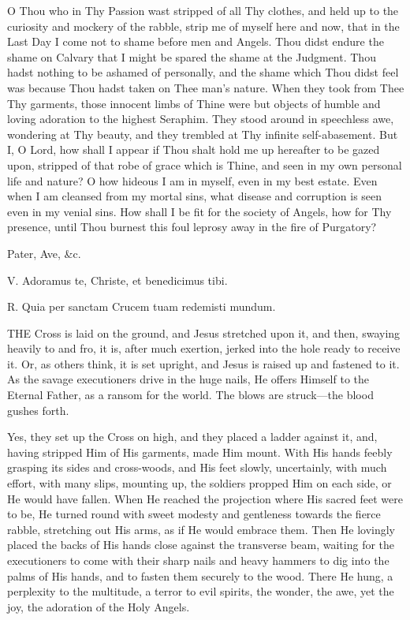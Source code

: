 O Thou who in Thy Passion wast
stripped of all Thy clothes, and held up to the curiosity and mockery of
the rabble, strip me of myself here and now, that in the Last Day I come
not to shame before men and Angels. Thou didst endure the shame on
Calvary that I might be spared the shame at the Judgment. Thou hadst
nothing to be ashamed of personally, and the shame which Thou didst feel
was because Thou hadst taken on Thee man's nature. When they took from
Thee Thy garments, those innocent limbs of Thine were but objects of
humble and loving adoration to the highest Seraphim. They stood around
in speechless awe, wondering at Thy beauty, and they trembled at Thy
infinite self-abasement. But I, O Lord, how shall I appear if Thou shalt
hold me up hereafter to be gazed upon, stripped of that robe of grace
which is Thine, and seen in my own personal life and nature? O how
hideous I am in myself, even in my best estate. Even when I am
cleansed from my mortal sins, what disease and corruption is seen even
in my venial sins. How shall I be fit for the society of Angels, how for
Thy presence, until Thou burnest this foul leprosy away in the fire of
Purgatory?

Pater, Ave, \&c.


V. Adoramus te, Christe, et
benedicimus tibi.

R. Quia per sanctam Crucem tuam redemisti mundum.

THE Cross is laid on
the ground, and Jesus stretched upon it, and then, swaying heavily to
and fro, it is, after much exertion, jerked into the hole ready to
receive it. Or, as others think, it is set upright, and Jesus is raised
up and fastened to it. As the savage executioners drive in the huge
nails, He offers Himself to the Eternal Father, as a ransom for the
world. The blows are struck—the blood gushes forth.

Yes, they set up the Cross on
high, and they placed a ladder against it, and, having stripped Him of
His garments, made Him mount. With His hands feebly grasping its sides
and cross-woods, and His feet slowly, uncertainly, with much effort,
with many slips, mounting up, the soldiers propped Him on each side, or
He would have fallen. When He reached the projection where His sacred
feet were to be, He turned round with sweet modesty and gentleness
towards the fierce rabble, stretching out His arms, as if He would
embrace them. Then He lovingly placed the backs of His hands close
against the transverse beam, waiting for the executioners to come with
their sharp nails and heavy hammers to dig into the palms of His
hands, and to fasten them securely to the wood. There He hung, a
perplexity to the multitude, a terror to evil spirits, the wonder, the
awe, yet the joy, the adoration of the Holy Angels.

